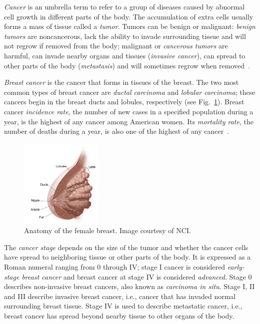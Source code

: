 \emph{Cancer} is an umbrella term to refer to a group of diseases caused by abnormal cell growth in different parts of the body. The accumulation of extra cells usually forms a mass of tissue called a \emph{tumor}. Tumors can be benign or malignant: \emph{benign tumors} are noncancerous, lack the ability to invade surrounding tissue and will not regrow if removed from the body;  malignant or \emph{cancerous tumors} are harmful, can invade nearby organs and tissues (\emph{invasive cancer}), can spread to other parts of the body (\emph{metastasis}) and will sometimes regrow when removed~\cite{WYNTKABreastCancer2012}.

\emph{Breast cancer} is the cancer that forms in tissues of the breast. The two most common types of breast cancer are \emph{ductal carcinoma} and \emph{lobular carcinoma}; these cancers begin in the breast ducts and lobules, respectively (see Fig.~\ref{fig:BreastAnatomy}). Breast cancer \emph{incidence rate}, the number of new cases in a specified population during a year, is the highest of any cancer among American women. Its \emph{mortality rate}, the number of deaths during a year, is also one of the highest of any cancer~\cite{Howlader2014}.

\begin{figure}[h]
	\centering
	\includegraphics[width = 0.35\textwidth]{plots/breastAnatomy.png}
	\caption[Female Breast Anatomy]{Anatomy of the female breast. Image courtesy of NCI.}
	\label{fig:BreastAnatomy}
\end{figure}

The \emph{cancer stage} depends on the size of the tumor and whether the cancer cells have spread to neighboring tissue or other parts of the body. It is expressed as a Roman numeral ranging from 0 through IV; stage I cancer is considered \emph{early-stage breast cancer} and breast cancer at stage IV is considered \emph{advanced}. Stage 0 describes non-invasive breast cancers, also known as \emph{carcinoma in situ}. Stage I, II and III describe invasive breast cancer, i.e., cancer that has invaded normal surrounding breast tissue. Stage IV is used to describe metastatic cancer, i.e., breast cancer has spread beyond nearby tissue to other organs of the body.
